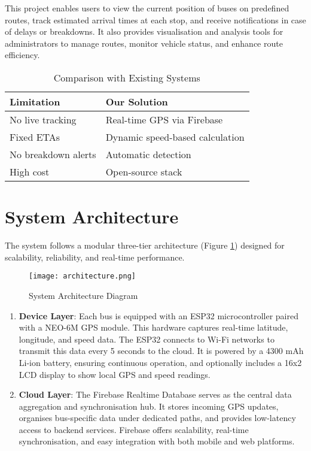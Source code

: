 \documentclass{article}
\begin{document}
\begin{multicols}{2}
\vspace{1em}
This project enables users to view the current position of buses on predefined routes, track estimated arrival times at each stop, and receive notifications in case of delays or breakdowns. It also provides visualisation and analysis tools for administrators to manage routes, monitor vehicle status, and enhance route efficiency.

\begin{table}[H]
\centering
\caption{Comparison with Existing Systems}
\label{tab:comparison}
\begin{tabular}{p{4cm}p{3cm}}
\toprule
\textbf{Limitation} & \textbf{Our Solution} \\
\midrule
No live tracking & Real-time GPS via Firebase \\
Fixed ETAs & Dynamic speed-based calculation \\
No breakdown alerts & Automatic detection \\
High cost & Open-source stack \\
\bottomrule
\end{tabular}
\end{table}

\section{System Architecture}
\vspace{0.5em}
The system follows a modular three-tier architecture (Figure \ref{fig:arch}) designed for scalability, reliability, and real-time performance.

\begin{figure}[H]
\centering
\texttt{[image: architecture.png]} %
\caption{System Architecture Diagram}
\label{fig:arch}
\end{figure}

\begin{enumerate}
\item \textbf{Device Layer}: Each bus is equipped with an ESP32 microcontroller paired with a NEO-6M GPS module. This hardware captures real-time latitude, longitude, and speed data. The ESP32 connects to Wi-Fi networks to transmit this data every 5 seconds to the cloud. It is powered by a 4300 mAh Li-ion battery, ensuring continuous operation, and optionally includes a 16x2 LCD display to show local GPS and speed readings.

\item \textbf{Cloud Layer}: The Firebase Realtime Database serves as the central data aggregation and synchronisation hub. It stores incoming GPS updates, organises bus-specific data under dedicated paths, and provides low-latency access to backend services. Firebase offers scalability, real-time synchronisation, and easy integration with both mobile and web platforms.


\end{enumerate}
\end{multicols}
\end{document}
